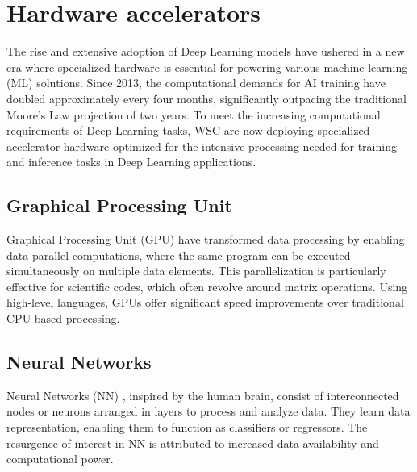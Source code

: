 \section{Hardware accelerators}

The rise and extensive adoption of Deep Learning models have ushered in a new era where specialized hardware is essential for powering various machine learning (ML) solutions.
Since 2013, the computational demands for AI training have doubled approximately every four months, significantly outpacing the traditional Moore's Law projection of two years.
To meet the increasing computational requirements of Deep Learning tasks, WSC are now deploying specialized accelerator hardware optimized for the intensive processing needed for training and inference tasks in Deep Learning applications.

\subsection{Graphical Processing Unit}
Graphical Processing Unit (GPU) have transformed data processing by enabling data-parallel computations, where the same program can be executed simultaneously on multiple data elements. 
This parallelization is particularly effective for scientific codes, which often revolve around matrix operations.
Using high-level languages, GPUs offer significant speed improvements over traditional CPU-based processing.

\subsection{Neural Networks}
Neural Networks (NN) , inspired by the human brain, consist of interconnected nodes or neurons arranged in layers to process and analyze data. 
They learn data representation, enabling them to function as classifiers or regressors. 
The resurgence of interest in NN is attributed to increased data availability and computational power.

